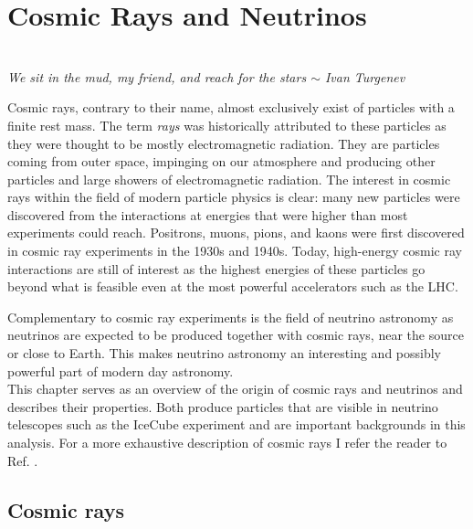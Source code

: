 \chapter{Cosmic Rays and Neutrinos}
\label{ch:cr}
\begin{flushright}
\textit{\\We sit in the mud, my friend, and reach for the stars $\sim$ Ivan Turgenev\\}\end{flushright}


\noindent Cosmic rays, contrary to their name, almost exclusively exist of particles with a finite rest mass. The term \textit{rays} was historically attributed to these particles as they were thought to be mostly electromagnetic radiation. They are particles coming from outer space, impinging on our atmosphere and producing other particles and large showers of electromagnetic radiation.
The interest in cosmic rays within the field of modern particle physics is clear: many new particles were discovered from the interactions at energies that were higher than most experiments could reach. Positrons, muons, pions, and kaons were first discovered in cosmic ray experiments in the 1930s and 1940s. Today, high-energy cosmic ray interactions are still of interest as the highest energies of these particles go beyond what is feasible even at the most powerful accelerators such as the LHC.

Complementary to cosmic ray experiments is the field of neutrino astronomy as neutrinos are expected to be produced together with cosmic rays, near the source or close to Earth. This makes neutrino astronomy an interesting and possibly powerful part of modern day astronomy.\\

\noindent This chapter serves as an overview of the origin of cosmic rays and neutrinos and describes their properties. Both produce particles that are visible in neutrino telescopes such as the IceCube experiment and are important backgrounds in this analysis. For a more exhaustive description of cosmic rays I refer the reader to Ref. \cite{Gaisser:2016uoy}.

\section{Cosmic rays}
